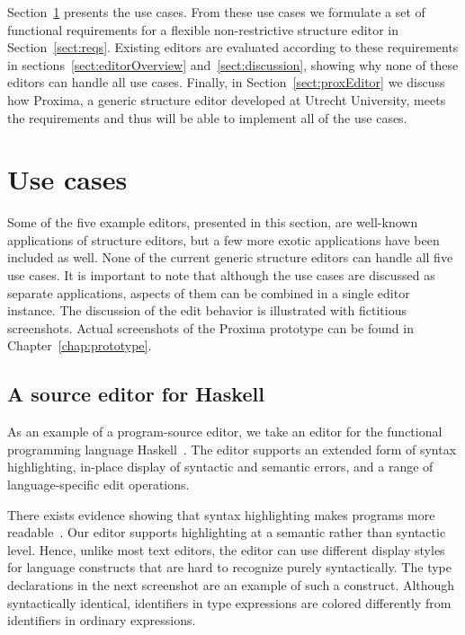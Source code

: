 \documentclass{speauth}
\begin{document}
Section~\ref{sect:usecases} presents the use cases. From these use cases we formulate a set of functional requirements for a flexible non-restrictive structure editor in Section~\ref{sect:reqs}. Existing editors are evaluated according to these requirements in sections~\ref{sect:editorOverview} and~\ref{sect:discussion}, showing why none of these editors can handle all use cases. Finally, in Section~\ref{sect:proxEditor} we discuss how Proxima, a generic structure editor developed at Utrecht University, meets the requirements and thus will be able to implement all of the use cases.

\section{Use cases} \label{sect:usecases}


Some of the five example editors, presented in this section, are well-known applications of structure editors, but a few more exotic applications have been included as well. None of the current generic structure editors can handle all five use cases. It is important to note that although the use cases are discussed as separate applications, aspects of them can be combined in a single editor instance.
The discussion of the edit behavior is illustrated with fictitious screenshots. Actual screenshots of the Proxima prototype can be found in Chapter~\ref{chap:prototype}.



%								
\subsection{A source editor for Haskell}  \label{sect:sourceeditor} 

As an example of a program-source editor, we take an editor for the functional programming language Haskell~\cite{peytonJones03haskell}. The editor supports an extended form of syntax highlighting, in-place display of syntactic and semantic errors, and a range of language-specific edit operations. 

There exists evidence showing that syntax highlighting makes programs more readable~\cite{baecker88readability,omanCook90typography}. Our editor supports highlighting at a semantic rather than syntactic level. Hence, unlike most text editors, the editor can use different display styles for language constructs that are hard to recognize purely syntactically. The type declarations in the next screenshot are an example of such a construct. Although syntactically identical, identifiers in type expressions are colored differently from identifiers in ordinary expressions.
\end{document}
